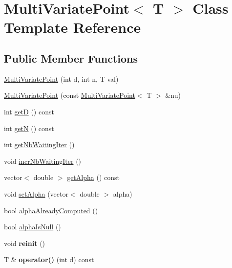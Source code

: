 \hypertarget{class_multi_variate_point}{}\section{Multi\+Variate\+Point$<$ T $>$ Class Template Reference}
\label{class_multi_variate_point}
\subsection*{Public Member Functions}
\begin{DoxyCompactItemize}
\item 
\hyperlink{class_multi_variate_point_a2ab2acda8a5c5289220f130117bd5f95}{Multi\+Variate\+Point} (int d, int n, T val)
\item 
\hyperlink{class_multi_variate_point_ad497f54132498b6141484057d042e157}{Multi\+Variate\+Point} (const \hyperlink{class_multi_variate_point}{Multi\+Variate\+Point}$<$ T $>$ \&nu)
\item 
int \hyperlink{class_multi_variate_point_a32acfceae3008c886b5101a292d16efb}{getD} () const 
\item 
int \hyperlink{class_multi_variate_point_ac3e4878d6202deeb489a7c117799e53b}{getN} () const 
\item 
int \hyperlink{class_multi_variate_point_accf19c239f3359ac9d8d6057a7b913c2}{get\+Nb\+Waiting\+Iter} ()
\item 
void \hyperlink{class_multi_variate_point_aedc8c232c76736f1f5e4a563bf8d4fc4}{incr\+Nb\+Waiting\+Iter} ()
\item 
vector$<$ double $>$ \hyperlink{class_multi_variate_point_ac67af657777f1e7c31b1b5d11df2b788}{get\+Alpha} () const 
\item 
void \hyperlink{class_multi_variate_point_aa7a4e466b5337a6978b5140ca2492545}{set\+Alpha} (vector$<$ double $>$ alpha)
\item 
bool \hyperlink{class_multi_variate_point_a5fa298c0efa8ca27708cb17b82e28316}{alpha\+Already\+Computed} ()
\item 
bool \hyperlink{class_multi_variate_point_a5afa1773c5bdcf30a9b51b29cc4cb6a9}{alpha\+Is\+Null} ()
\item 
void {\bfseries reinit} ()\hypertarget{class_multi_variate_point_aa01525fcdeee3650a5b10e9fd5375671}{}\label{class_multi_variate_point_aa01525fcdeee3650a5b10e9fd5375671}

\item 
T \& {\bfseries operator()} (int d) const \hypertarget{class_multi_variate_point_a1615d3e6f128a882dfa038051b0f3225}{}\label{class_multi_variate_point_a1615d3e6f128a882dfa038051b0f3225}


\end{DoxyCompactItemize}
